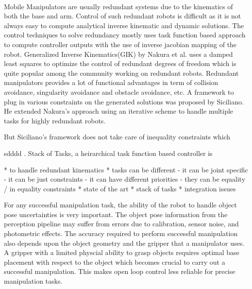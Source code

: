  \paragraph{}
  Mobile Manipulators are usually redundant systems due to the kinematics of both the base and arm. Control of such redundant robots is difficult as it is not always easy to compute analytical inverse kinematic and dynamic solutions. The control techniques to solve redundancy mostly uses task function based approach to compute controller outputs with the use of inverse jacobian mapping of the robot. Generalized Inverse Kinematics(GIK) by Nakura et al. uses a damped least squares to optimize the control of redundant degrees of freedom which is quite popular among the community working on redundant robots. Redundant manipulators provides a lot of functional advantages in term of collision avoidance, singularity avoidance and obstacle avoidance, etc. A framework to plug in various constraints on the generated solutions was proposed by Siciliano. He extended Nakura's approach using an iterative scheme to handle multiple tasks for highly redundant robots. 

But Siciliano's framework does not take care of inequality constraints which  
  
    
  
  
  sdddd
  . Stack of Tasks, a heirarchical
  task function based controller is 
  
  
  
  * to handle redundant kinematics
  * tasks can be different 
    - it can be joint specific
    - it can be just constraints
    - it can have different priorities
    - they can be equality / in equality constraints
  * state of the art  
  * stack of tasks
  * integration issues
  
For any successful manipulation task, the ability of the robot to handle object pose uncertainties is very important. The object pose information from the perception pipeline
may suffer from errors due to calibration, sensor noise, and photometric effects. The accuracy required to perform successful manipulation also depends upon
the object geometry and the gripper that a manipulator uses. A gripper with a limited physcial ability to grasp objects requires optimal base placement with respect to the object which becomes crucial to carry out a successful manipulation. This makes open loop control less reliable for precise manipulation tasks. 
